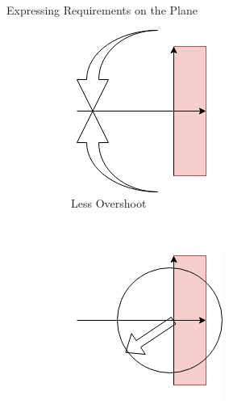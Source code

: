 \documentclass{../templates/topic}
\begin{document}
\begin{section}{Expressing Requirements on the Plane}
\begin{figure}
\begin{subfigure}[b]{0.4\textwidth}
		\includegraphics[width=\textwidth]{assets/complex_plane_overshoot.png}
		\caption{Less Overshoot}
		\end{subfigure}
		\\
		\begin{subfigure}[b]{0.4\textwidth}
		\includegraphics[width=\textwidth]{assets/complex_plane_rise.png}

\end{subfigure}
\end{figure}
\end{section}
\end{document}
